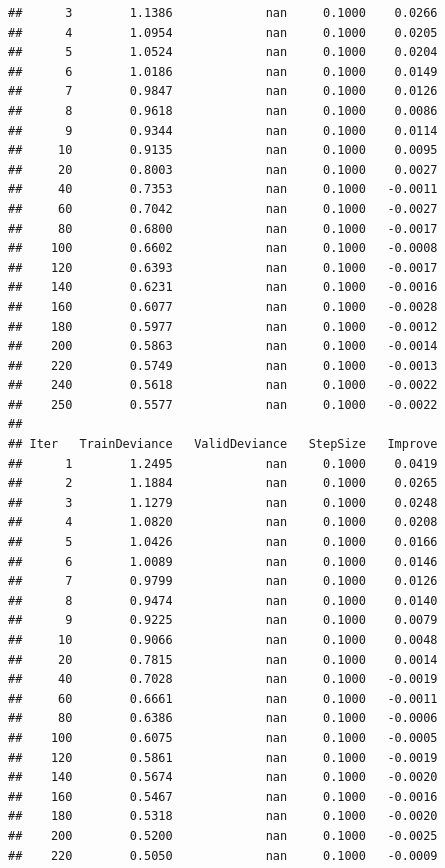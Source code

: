 \documentclass[]{book}
\begin{document}
\begin{verbatim}
##      3        1.1386             nan     0.1000    0.0266
##      4        1.0954             nan     0.1000    0.0205
##      5        1.0524             nan     0.1000    0.0204
##      6        1.0186             nan     0.1000    0.0149
##      7        0.9847             nan     0.1000    0.0126
##      8        0.9618             nan     0.1000    0.0086
##      9        0.9344             nan     0.1000    0.0114
##     10        0.9135             nan     0.1000    0.0095
##     20        0.8003             nan     0.1000    0.0027
##     40        0.7353             nan     0.1000   -0.0011
##     60        0.7042             nan     0.1000   -0.0027
##     80        0.6800             nan     0.1000   -0.0017
##    100        0.6602             nan     0.1000   -0.0008
##    120        0.6393             nan     0.1000   -0.0017
##    140        0.6231             nan     0.1000   -0.0016
##    160        0.6077             nan     0.1000   -0.0028
##    180        0.5977             nan     0.1000   -0.0012
##    200        0.5863             nan     0.1000   -0.0014
##    220        0.5749             nan     0.1000   -0.0013
##    240        0.5618             nan     0.1000   -0.0022
##    250        0.5577             nan     0.1000   -0.0022
## 
## Iter   TrainDeviance   ValidDeviance   StepSize   Improve
##      1        1.2495             nan     0.1000    0.0419
##      2        1.1884             nan     0.1000    0.0265
##      3        1.1279             nan     0.1000    0.0248
##      4        1.0820             nan     0.1000    0.0208
##      5        1.0426             nan     0.1000    0.0166
##      6        1.0089             nan     0.1000    0.0146
##      7        0.9799             nan     0.1000    0.0126
##      8        0.9474             nan     0.1000    0.0140
##      9        0.9225             nan     0.1000    0.0079
##     10        0.9066             nan     0.1000    0.0048
##     20        0.7815             nan     0.1000    0.0014
##     40        0.7028             nan     0.1000   -0.0019
##     60        0.6661             nan     0.1000   -0.0011
##     80        0.6386             nan     0.1000   -0.0006
##    100        0.6075             nan     0.1000   -0.0005
##    120        0.5861             nan     0.1000   -0.0019
##    140        0.5674             nan     0.1000   -0.0020
##    160        0.5467             nan     0.1000   -0.0016
##    180        0.5318             nan     0.1000   -0.0020
##    200        0.5200             nan     0.1000   -0.0025
##    220        0.5050             nan     0.1000   -0.0009

\end{verbatim}
\end{document}
